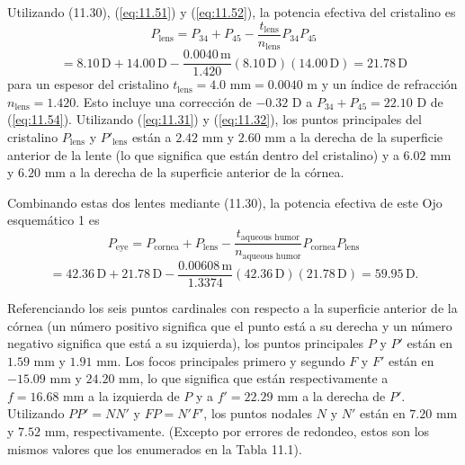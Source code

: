 \documentclass[12pt]{book}
\begin{document}
Utilizando (11.30), (\ref{eq:11.51}) y (\ref{eq:11.52}), la potencia efectiva del cristalino es
\begin{equation}
\label{eq:11.60}
P_{\text{lens}} = P_{34} + P_{45} - \frac{t_{\text{lens}}}{n_{\text{lens}}} P_{34} P_{45}
\end{equation}
\begin{equation}
\label{eq:11.61}
= 8.10\,\text{D} + 14.00\,\text{D} - \frac{0.0040\,\text{m}}{1.420} (8.10\,\text{D})(14.00\,\text{D}) = 21.78\,\text{D}
\end{equation}
para un espesor del cristalino $t_{\text{lens}} = 4.0\text{ mm} = 0.0040\text{ m}$ y un índice de refracción $n_{\text{lens}} = 1.420$. Esto incluye una corrección de $-0.32\text{ D}$ a $P_{34} + P_{45} = 22.10\text{ D}$ de (\ref{eq:11.54}). Utilizando (\ref{eq:11.31}) y (\ref{eq:11.32}), los puntos principales del cristalino $P_{\text{lens}}$ y $P'_{\text{lens}}$ están a $2.42\text{ mm}$ y $2.60\text{ mm}$ a la derecha de la superficie anterior de la lente (lo que significa que están dentro del cristalino) y a $6.02\text{ mm}$ y $6.20\text{ mm}$ a la derecha de la superficie anterior de la córnea.

Combinando estas dos lentes mediante (11.30), la potencia efectiva de este Ojo esquemático 1 es
\begin{equation}
\label{eq:11.62}
P_{\text{eye}} = P_{\text{cornea}} + P_{\text{lens}} - \frac{t_{\text{aqueous humor}}}{n_{\text{aqueous humor}}} P_{\text{cornea}} P_{\text{lens}}
\end{equation}
\begin{equation}
\label{eq:11.63}
= 42.36\,\text{D} + 21.78\,\text{D} - \frac{0.00608\,\text{m}}{1.3374} (42.36\,\text{D})(21.78\,\text{D}) = 59.95\,\text{D}.
\end{equation}

Referenciando los seis puntos cardinales con respecto a la superficie anterior de la córnea (un número positivo significa que el punto está a su derecha y un número negativo significa que está a su izquierda), los puntos principales $P$ y $P'$ están en $1.59\text{ mm}$ y $1.91\text{ mm}$. Los focos principales primero y segundo $F$ y $F'$ están en $-15.09\text{ mm}$ y $24.20\text{ mm}$, lo que significa que están respectivamente a $f = 16.68\text{ mm}$ a la izquierda de $P$ y a $f' = 22.29\text{ mm}$ a la derecha de $P'$. Utilizando $PP' = NN'$ y $FP = N'F'$, los puntos nodales $N$ y $N'$ están en $7.20\text{ mm}$ y $7.52\text{ mm}$, respectivamente. (Excepto por errores de redondeo, estos son los mismos valores que los enumerados en la Tabla 11.1).
\end{document}
